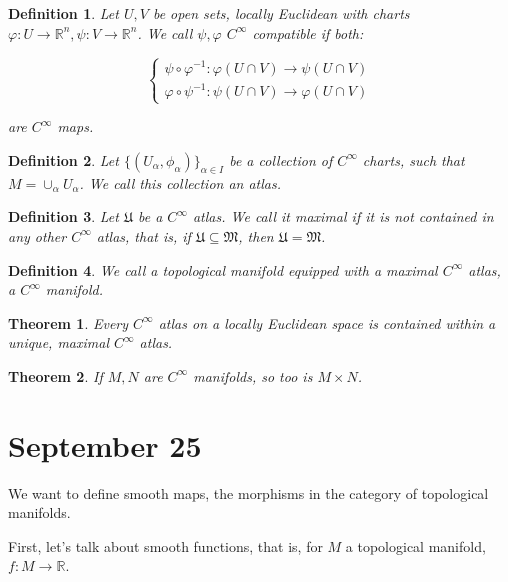 \documentclass[10pt]{article}
\newtheorem{definition}{Definition}[section]
\newtheorem{theorem}{Theorem}[section]
\begin{document}
\begin{definition}
Let $U, V$ be open sets, locally Euclidean with charts $\varphi: U \to \mathbb{R}^n, \psi: V \to \mathbb{R}^n$. We call $\psi, \varphi$  $C^\infty$ compatible if both:

$$\begin{cases} \psi \circ \varphi^{-1}: \varphi(U \cap V) \to \psi(U \cap V)\\  \varphi \circ \psi^{-1}: \psi(U \cap V) \to \varphi(U \cap V) \end{cases}$$

are $C^\infty$ maps.
\end{definition}

\begin{definition}
Let $\{ (U_\alpha, \phi_\alpha) \}_{\alpha \in I}$ be a collection of $C^\infty$ charts, such that $M = \cup_\alpha U_\alpha$. We call this collection an atlas.

\end{definition}

\begin{definition}
Let $\mathfrak{U}$ be a $C^\infty$ atlas. We call it maximal if it is not contained in any other $C^\infty $ atlas, that is, if $\mathfrak{U} \subseteq \mathfrak{M}$, then $\mathfrak{U} = \mathfrak{M}$.

\end{definition}

\begin{definition}
We call a topological manifold equipped with a maximal $C^\infty$ atlas, a $C^\infty$ manifold.
\end{definition}

\begin{theorem}
Every $C^\infty$ atlas on a locally Euclidean space is contained within a unique, maximal $C^\infty$ atlas.
\end{theorem}

\begin{theorem}
If $M, N$ are $C^\infty$ manifolds, so too is $M \times N$.

\end{theorem}

\section{September 25}

We want to define smooth maps, the morphisms in the category of topological manifolds.

First, let’s talk about smooth functions, that is, for $M$ a topological manifold, $f: M \to \mathbb{R}$.
\end{document}
